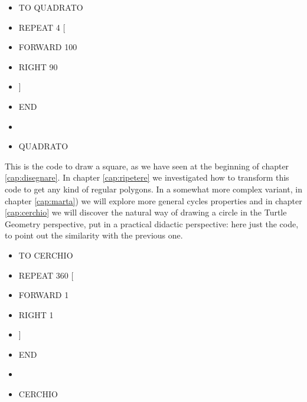 \begin{scriptsize}
\begin{minipage}{0.50\textwidth}
\begin{itemize}[itemsep=-3pt,parsep=2pt, leftmargin=-0.0mm ]
\item[] TO QUADRATO
\item[] \hspace{8pt} REPEAT 4 [
\item[] \hspace{8pt}\hspace{8pt} FORWARD 100
\item[] \hspace{8pt}\hspace{8pt} RIGHT 90
\item[] \hspace{8pt} ]
\item[] END
\item[]
\item[] QUADRATO
\end{itemize}
\end{minipage}
\end{scriptsize}

\vskip 1cm

This is the code to draw a square, as we have seen at the beginning of chapter \ref{cap:disegnare}. In chapter \ref{cap:ripetere} we investigated how to transform this code to get any kind of regular polygons. In a somewhat more complex variant, in chapter \ref{cap:marta}) we will explore more general cycles properties and in chapter \ref{cap:cerchio} we will discover the natural way of drawing a circle in the Turtle Geometry perspective, put in a practical didactic perspective: here just the code, to point out the similarity with the previous one.

\vskip 1cm

\begin{scriptsize}
\begin{minipage}{0.50\textwidth}
\begin{itemize}[itemsep=-3pt,parsep=2pt, leftmargin=-0.0mm ]
\item[] TO CERCHIO
\item[] \hspace{8pt} REPEAT 360 [
\item[] \hspace{8pt}\hspace{8pt} FORWARD 1
\item[] \hspace{8pt}\hspace{8pt} RIGHT 1
\item[] \hspace{8pt} ]
\item[] END
\item[]
\item[] CERCHIO
\end{itemize}
\end{minipage}
\end{scriptsize}

